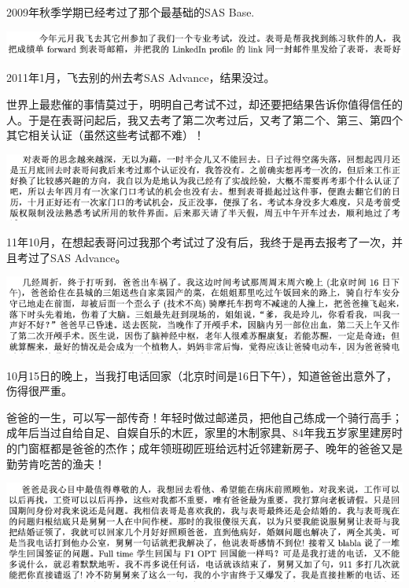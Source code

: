 \documentclass[9pt, b5paper]{article}
\begin{document}
2009年秋季学期已经考过了那个最基础的SAS Base.

\begin{center}
\includegraphics[width=.9\linewidth]{./pic/backups_plans_20210414_164402.png}
\end{center}

2011年1月，飞去别的州去考SAS Advance，结果没过。

世界上最悲催的事情莫过于，明明自己考试不过，却还要把结果告诉你值得信任的人。于是在表哥问起后，我又去考了第二次考过后，又考了第二个、第三、第四个其它相关认证（虽然这些考试都不难）！

\begin{center}
\includegraphics[width=.9\linewidth]{./pic/backups_plans_20210414_165509.png}
\end{center}

11年10月，在想起表哥问过我那个考试过了没有后，我终于是再去报考了一次，并且考过了SAS Advance。 

\begin{center}
\includegraphics[width=.9\linewidth]{./pic/backups_plans_20210414_193202.png}
\end{center}

10月15日的晚上，当我打电话回家（北京时间是16日下午），知道爸爸出意外了，伤得很严重。

爸爸的一生，可以写一部传奇！年轻时做过邮递员，把他自己练成一个骑行高手；成年后当过自给自足、自娱自乐的木匠，家里的木制家具、84年我五岁家里建房时的门窗框都是爸爸的杰作；成年领班砌匠班给远村近邻建新房子、晚年的爸爸又是勤劳肯吃苦的渔夫！  

\begin{center}
\includegraphics[width=.9\linewidth]{./pic/backups_plans_20210414_201442.png}
\end{center}
\end{document}
